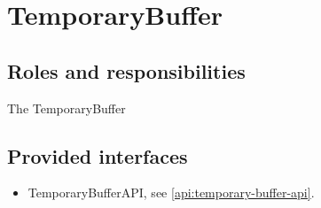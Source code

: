 \section{TemporaryBuffer}
\label{element:measurements-policy}

\subsection{Roles and responsibilities}

\npar The TemporaryBuffer

\subsection{Provided interfaces}

\begin{itemize}
  \item TemporaryBufferAPI, see \ref{api:temporary-buffer-api}.
\end{itemize}